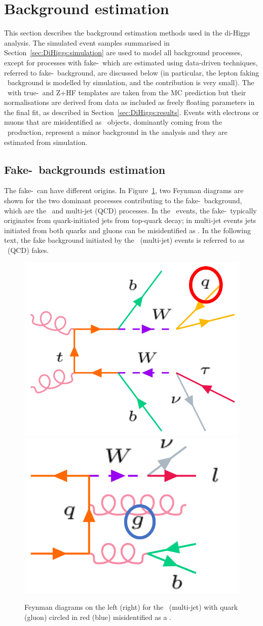 \section{Background estimation}
\label{sec:DiHiggs:backgroundEstimation}
This section describes the background estimation methods used in the di-Higgs analysis. 
The simulated event samples summarised in Section~\ref{sec:DiHiggs:simulation}
are used to model all background processes, except for processes with fake-\tauhad\ 
which are estimated using data-driven techniques, referred to fake-\tauhad\ background,
are discussed below 
(in particular, the lepton faking \tauhad\ background is modelled by simulation, and 
the contribution is very small). 
The \ttbar\ with true-\tauhad\ and Z+HF templates are taken from the MC prediction
but their normalisations are derived from data 
as included as freely floating parameters in the final fit,
as described in Section~\ref{sec:DiHiggs:results}.
Events with electrons or muons that are misidentified as \tauhad\ objects, 
dominantly coming from the \ttbar\ production, 
represent a minor background in the analysis and they are estimated from simulation. 

\subsection{Fake-\tauhad\ backgrounds estimation}
\label{sec:DiHiggs:lephadfake}


The fake-\tauhad\ can have different origins. 
In Figure~\ref{fig:fakes:feynman}, two Feynman diagrams are shown
for the two dominant processes contributing to the fake-\tauhad\ background,
which are the \ttbar\ and multi-jet (QCD) processes. 
In the \ttbar\ events, the fake-\tauhad\ typically originates from quark-initiated jets from 
top-quark decay; in multi-jet events jets initiated from both quarks and gluons can be
misidentified as \tauhad. 
In the following text, the fake background initiated by the \ttbar\ (multi-jet) events is referred to as
\ttbar\ (QCD) fakes.
\begin{figure}[htbp]
\centering
\includegraphics[width=.33\textwidth]{DiHiggs/plots/feynman_ttbarfakes.png} \hspace{2cm}
\includegraphics[width=.33\textwidth]{DiHiggs/plots/feynman_QCDfakes.png}
\caption{
Feynman diagrams on the left (right) for the \ttbar\ (multi-jet) with quark (gluon) circled in
red (blue) misidentified as a \tauhad. 
}
\label{fig:fakes:feynman}
\end{figure} 

